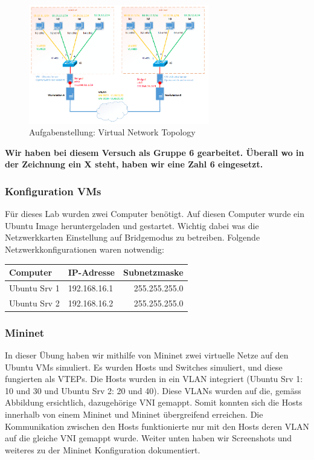 \documentclass[a4,12pt]{scrartcl}
\begin{document}
\begin{figure} [H]
	\begin{center}
	\includegraphics[width=0.70\textwidth]{./pictures/vxlan_config.png}
	\caption{Aufgabenstellung: Virtual Network Topology}
	\label{x}
	\end{center}
\end{figure}
\noindent \textbf{Wir haben bei diesem Versuch als Gruppe 6 gearbeitet. Überall wo in der Zeichnung ein X steht, haben wir eine Zahl 6 eingesetzt.}

\subsubsection{Konfiguration VMs}
Für dieses Lab wurden zwei Computer benötigt. Auf diesen Computer wurde ein Ubuntu Image heruntergeladen und gestartet. Wichtig dabei was die Netzwerkkarten Einstellung auf Bridgemodus zu betreiben. Folgende Netzwerkkonfigurationen waren notwendig: 
\begin{center}
    \begin{tabular}{@{} l l r@{}}\toprule    
    {Computer} & {IP-Adresse} & {Subnetzmaske}\\ \midrule
    Ubuntu Srv 1 & 192.168.16.1 & 255.255.255.0\\ \addlinespace
    Ubuntu Srv 2 & 192.168.16.2 & 255.255.255.0\\ 
    \bottomrule
    \end{tabular}
\end{center}

\subsubsection{Mininet}
In dieser Übung haben wir mithilfe von Mininet zwei virtuelle Netze auf den Ubuntu VMs simuliert. Es wurden Hosts und Switches simuliert, und diese fungierten als VTEPs. Die Hosts wurden in ein VLAN integriert (Ubuntu Srv 1: 10 und 30 und Ubuntu Srv 2: 20 und 40). Diese VLANs wurden auf die, gemäss Abbildung ersichtlich, dazugehörige VNI gemappt. Somit konnten sich die Hosts innerhalb von einem Mininet und Mininet übergreifend erreichen. Die Kommunikation zwischen den Hosts funktionierte nur mit den Hosts deren VLAN auf die gleiche VNI gemappt wurde. Weiter unten haben wir Screenshots und weiteres zu der Mininet Konfiguration dokumentiert. 
\end{document}
